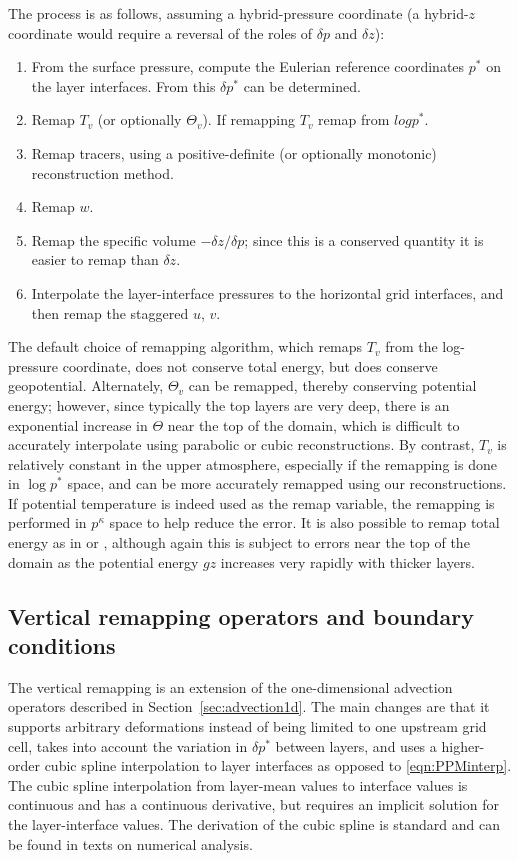 \documentclass[10pt,letterpaper,margin=1in]{memoir}
\begin{document}
The process is as follows, assuming a hybrid-pressure coordinate (a hybrid-$z$ coordinate would require a reversal of the roles of $\delta p$ and $\delta z$):
\begin{enumerate}
\item From the surface pressure, compute the Eulerian reference coordinates $p^*$ on the layer interfaces. From this $\delta p^*$ can be determined.
\item Remap $T_v$ (or optionally $\Theta_v$). If remapping $T_v$ remap from $log p^*$.
\item Remap tracers, using a positive-definite (or optionally monotonic) reconstruction method. 
\item Remap $w$.
\item Remap the specific volume $-\delta z/ \delta p$; since this is a conserved quantity it is easier to remap than $\delta z$.
\item Interpolate the layer-interface pressures to the horizontal grid interfaces, and then remap the staggered $u$, $v$.
\end{enumerate}
The default choice of remapping algorithm, which remaps $T_v$ from the log-pressure coordinate, does not conserve total energy, but does conserve geopotential. Alternately, $\Theta_v$ can be remapped, thereby conserving potential energy; however, since typically the top layers are very deep, there is an exponential increase in $\Theta$ near the top of the domain, which is difficult to accurately interpolate using parabolic or cubic reconstructions. By contrast, $T_v$ is relatively constant in the upper atmosphere, especially if the remapping is done in $\log p^*$ space, and can be more accurately remapped using our reconstructions. If potential temperature is indeed used as the remap variable, the remapping is performed in $p^\kappa$ space to help reduce the error. It is also possible to remap total energy as in \citet{L04} or \citet{LiChen2019}, although again this is subject to errors near the top of the domain as the potential energy $gz$ increases very rapidly with thicker layers.

\subsection{Vertical remapping operators and boundary conditions} \label{sec:verticaloperators}

The vertical remapping is an extension of the one-dimensional advection operators described in Section~\ref{sec:advection1d}. The main changes are that it supports arbitrary deformations instead of being limited to one upstream grid cell, takes into account the variation in  $\delta p^*$ between layers, and uses a higher-order cubic spline interpolation to layer interfaces as opposed to \eqref{eqn:PPMinterp}. The cubic spline interpolation from layer-mean values to interface values is continuous and has a continuous derivative, but requires an implicit solution for the layer-interface values. The derivation of the cubic spline is standard and can be found in texts on numerical analysis.
\end{document}
